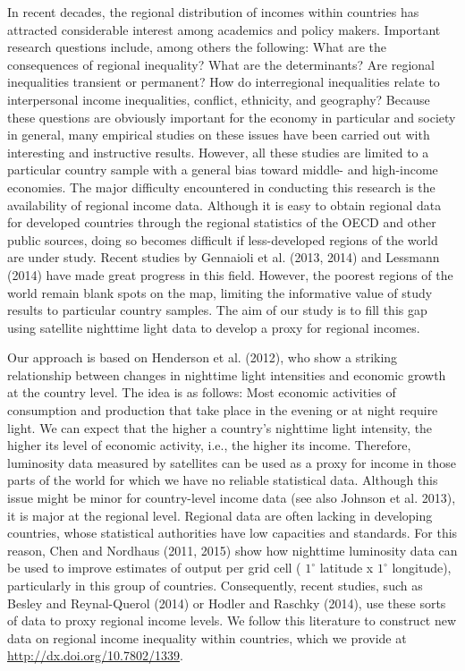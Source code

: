 \documentclass[10pt]{article}
\begin{document}
In recent decades, the regional distribution of incomes within countries has attracted considerable interest among academics and policy makers. 
Important research questions include, among others the following: 
What are the consequences of regional inequality? What are the determinants? 
Are regional inequalities transient or permanent?
How do interregional inequalities relate to interpersonal income inequalities, conflict, ethnicity, and geography? 
Because these questions are obviously important for the economy in particular and society in general, many empirical studies on these issues have been carried out with interesting and instructive results.
However, all these studies are limited to a particular country sample with a general bias toward middle- and high-income economies.
The major difficulty encountered in conducting this research is the availability of regional income data.
Although it is easy to obtain regional data for developed countries through the regional statistics of the OECD and other public sources, doing so becomes difficult if less-developed regions of the world are under study.
Recent studies by Gennaioli et al. (2013, 2014) and Lessmann (2014) have made great progress in this field.
However, the poorest regions of the world remain blank spots on the map, limiting the informative value of study results to particular country samples.
The aim of our study is to fill this gap using satellite nighttime light data to develop a proxy for regional incomes.

Our approach is based on Henderson et al. (2012), who show a striking relationship between changes in nighttime light intensities and economic growth at the country level. 
The idea is as follows: Most economic activities of consumption and production that take place in the evening or at night require light. 
We can expect that the higher a country's nighttime light intensity, the higher its level of economic activity, i.e., the higher its income. 
Therefore, luminosity data measured by satellites can be used as a proxy for income in those parts of the world for which we have no reliable statistical data. Although this issue might be minor for country-level income data (see also Johnson et al. 2013), it is major at the regional level. 
Regional data are often lacking in developing countries, whose statistical authorities have low capacities and standards. 
For this reason, Chen and Nordhaus (2011, 2015) show how nighttime luminosity data can be used to improve estimates of output per grid cell ( $1^{\circ}$ latitude x $1^{\circ}$ longitude), particularly in this group of countries. 
Consequently, recent studies, such as Besley and Reynal-Querol (2014) or Hodler and Raschky (2014), use these sorts of data to proxy regional income levels.
We follow this literature to construct new data on regional income inequality within countries, which we provide at \href{http://dx.doi.org/10.7802/1339}{http://dx.doi.org/10.7802/1339}.
\end{document}
